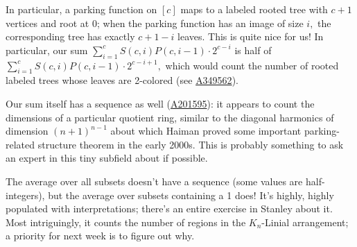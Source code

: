 In particular, a parking function on $[c]$ maps to a labeled rooted tree with $c+1$ vertices and root at $0$; when the parking function has an image of size $i,$ the corresponding tree has exactly $c+1-i$ leaves. This is quite nice for us! In particular, our sum $\displaystyle\sum_{i=1}^{c}S(c,i)P(c,i-1)\cdot 2^{c-i}$ is half of $\displaystyle\sum_{i=1}^{c}S(c,i)P(c,i-1)\cdot 2^{c-i+1},$ which would count the number of rooted labeled trees whose leaves are 2-colored (see \href{https://oeis.org/A349562}{A349562}).

Our sum itself has a sequence as well (\href{https://oeis.org/A201595}{A201595}): it appears to count the dimensions of a particular quotient ring, similar to the diagonal harmonics of dimension $(n+1)^{n-1}$ about which Haiman proved some important parking-related structure theorem in the early 2000s. This is probably something to ask an expert in this tiny subfield about if possible.

The average over all subsets doesn't have a sequence (some values are half-integers), but the average over subsets containing a 1 does! It's highly, highly populated with interpretations; there's an entire exercise in Stanley about it. Most intriguingly, it counts the number of regions in the $K_n$-Linial arrangement; a priority for next week is to figure out why.


